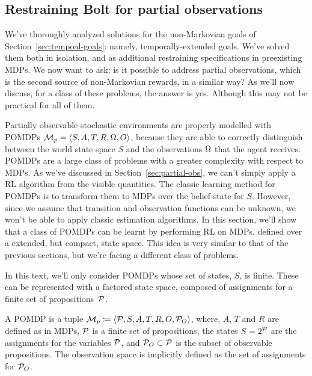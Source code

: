 \subsection{Restraining Bolt for partial observations}

\label{sec:rb-for-partial-obs}

We've thoroughly analyzed solutions for the non-Markovian goals of
Section~\ref{sec:tempoal-goals}: namely, temporally-extended goals. We've
solved them both in isolation, and as additional restraining specifications in
preexisting MDPs. We now want to ask: is it possible to address partial
observations, which is the second source of non-Markovian rewards, in a
similar way? As we'll now discuss, for a class of these problems, the answer
is yes. Although this may not be practical for all of them.

Partially observable stochastic environments are properly modelled with POMDPs
$\mathcal{M}_p = \langle S, A, T, R, \Omega, O\rangle$, because they are able to
correctly distinguish between the world state space $S$ and the observations
$\Omega$ that the agent receives. POMDPs are a large class of problems with a
greater complexity with respect to MDPs. As we've discussed in
Section~\ref{sec:partial-obs}, we can't simply apply a RL algorithm from the
visible quantities. The classic learning method for POMDPs is to transform
them to MDPs over the belief-state for $S$. However, since we assume that
transition and observation functions can be unknown, we won't be able to apply
classic estimation algorithms. In this section, we'll show that a class of
POMDPs can be learnt by performing RL on MDPs, defined over a extended, but
compact, state space. This idea is very similar to that of the previous
sections, but we're facing a different class of problems.

In this text, we'll only consider POMDPs whose set of states, $S$, is finite.
These can be represented with a factored state space, composed of assignments
for a finite set of propositions~$\mathcal{P}$.
\enlargethispage{1\baselineskip}
\begin{definition}
	A POMDP is a tuple $\mathcal{M}_p \coloneqq \langle \mathcal{P}, S, A,
	T, R, O, \mathcal{P}_O \rangle$, where, $A$, $T$ and $R$ are defined
	as in MDPs, $\mathcal{P}$ is a finite set of propositions, the states $S =
	2^{\mathcal{P}}$ are the assignments for the variables $\mathcal{P}$, and
	$\mathcal{P}_O \subset \mathcal{P}$ is the subset of observable propositions.
	The observation space is implicitly defined as the set of assignments for
	$\mathcal{P}_O$.
\end{definition}

